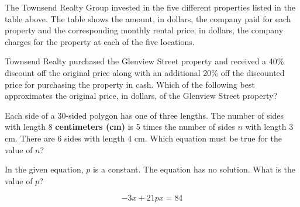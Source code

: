 \vspace{1em}

The Townsend Realty Group invested in the five different properties listed in the table above. The table shows the amount, in dollars, the company paid for each property and the corresponding monthly rental price, in dollars, the company charges for the property at each of the five locations.

Townsend Realty purchased the Glenview Street property and received a 40\% discount off the original price along with an additional 20\% off the discounted price for purchasing the property in cash. Which of the following best approximates the original price, in dollars, of the Glenview Street property?

\vspace{0.75em}


\newpage
\noindent\markforreview

\vspace{1em}

Each side of a 30-sided polygon has one of three lengths. The number of sides with length 8 \textbf{centimeters (cm)} is 5 times the number of sides \( n \) with length 3 cm. There are 6 sides with length 4 cm. Which equation must be true for the value of \( n \)?

\vspace{0.75em}


\vspace{2em}

\noindent\markforreview

\vspace{1em}

In the given equation, \( p \) is a constant. The equation has no solution. What is the value of \( p \)?

\[
-3x + 21px = 84
\]

\vspace{0.75em}



\newpage
\noindent\markforreview

\vspace{1em}

